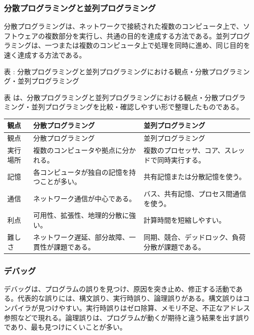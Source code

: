\subsubsection{分散プログラミングと並列プログラミング}

分散プログラミングは、ネットワークで接続された複数のコンピュータ上で、ソフトウェアの複数部分を実行し、共通の目的を達成する方法である。並列プログラミングは、一つまたは複数のコンピュータ上で処理を同時に進め、同じ目的を速く達成する方法である。

\par\smallskip\noindent{}\label{tab:ch16-14}表 \thetable: 分散プログラミングと並列プログラミングにおける観点・分散プログラミング・並列プログラミング\par\smallskip
表 \thetable は、分散プログラミングと並列プログラミングにおける観点・分散プログラミング・並列プログラミングを比較・確認しやすい形で整理したものである。\par\smallskip
\begin{longtable}{>{\raggedright\arraybackslash}p{}>{\raggedright\arraybackslash}p{}>{\raggedright\arraybackslash}p{}}
\toprule
観点 & 分散プログラミング & 並列プログラミング \\
\midrule
\endfirsthead
\toprule
観点 & 分散プログラミング & 並列プログラミング \\
\midrule
\endhead
実行場所 & 複数のコンピュータや拠点に分かれる。 & 複数のプロセッサ、コア、スレッドで同時実行する。 \\
記憶 & 各コンピュータが独自の記憶を持つことが多い。 & 共有記憶または分散記憶を使う。 \\
通信 & ネットワーク通信が中心である。 & バス、共有記憶、プロセス間通信を使う。 \\
利点 & 可用性、拡張性、地理的分散に強い。 & 計算時間を短縮しやすい。 \\
難しさ & ネットワーク遅延、部分故障、一貫性が課題である。 & 同期、競合、デッドロック、負荷分散が課題である。 \\
\bottomrule
\end{longtable}

\subsubsection{デバッグ}

デバッグは、プログラムの誤りを見つけ、原因を突き止め、修正する活動である。代表的な誤りには、構文誤り、実行時誤り、論理誤りがある。構文誤りはコンパイラが見つけやすい。実行時誤りはゼロ除算、メモリ不足、不正なアドレス参照などで現れる。論理誤りは、プログラムが動くが期待と違う結果を出す誤りであり、最も見つけにくいことが多い。

